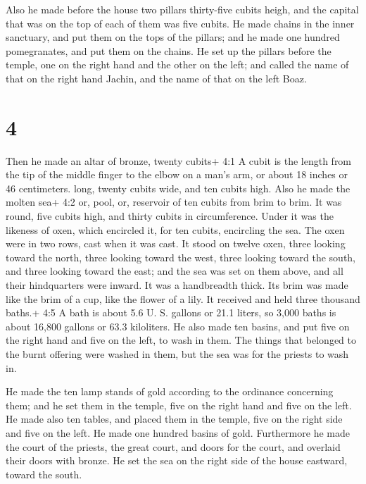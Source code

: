  Also he made before the house two pillars thirty-five
cubits heigh, and the capital that was on the top of each of them was
five cubits.  He made chains in the inner sanctuary, and
put them on the tops of the pillars; and he made one hundred
pomegranates, and put them on the chains.  He set up the
pillars before the temple, one on the right hand and the other on the
left; and called the name of that on the right hand Jachin, and the name
of that on the left Boaz.

\hypertarget{section-3}{%
\section{4}\label{section-3}}

 Then he made an altar of bronze, twenty cubits+ 4:1 A cubit
is the length from the tip of the middle finger to the elbow on a man's
arm, or about 18 inches or 46 centimeters. long, twenty cubits wide, and
ten cubits high.  Also he made the molten sea+ 4:2 or, pool,
or, reservoir of ten cubits from brim to brim. It was round, five cubits
high, and thirty cubits in circumference.  Under it was the
likeness of oxen, which encircled it, for ten cubits, encircling the
sea. The oxen were in two rows, cast when it was cast.  It
stood on twelve oxen, three looking toward the north, three looking
toward the west, three looking toward the south, and three looking
toward the east; and the sea was set on them above, and all their
hindquarters were inward.  It was a handbreadth thick. Its
brim was made like the brim of a cup, like the flower of a lily. It
received and held three thousand baths.+ 4:5 A bath is about 5.6 U. S.
gallons or 21.1 liters, so 3,000 baths is about 16,800 gallons or 63.3
kiloliters.  He also made ten basins, and put five on the
right hand and five on the left, to wash in them. The things that
belonged to the burnt offering were washed in them, but the sea was for
the priests to wash in.

 He made the ten lamp stands of gold according to the
ordinance concerning them; and he set them in the temple, five on the
right hand and five on the left.  He made also ten tables,
and placed them in the temple, five on the right side and five on the
left. He made one hundred basins of gold.  Furthermore he
made the court of the priests, the great court, and doors for the court,
and overlaid their doors with bronze.  He set the sea on
the right side of the house eastward, toward the south.

